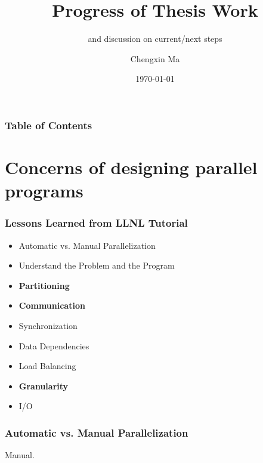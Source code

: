 \documentclass{beamer}
\title[Progress of Thesis Work] %
{Progress of Thesis Work}
\subtitle {and discussion on current/next steps}
\author[C Ma] %
{Chengxin Ma}
\institute[TU Delft] %
{
  \inst{}
  Faculty of Electrical Engineering, Mathematics and Computer Science \\
  Delft University of Technology
}
\date{\today}
\begin{document}
\frame{\titlepage}

\begin{frame}
\frametitle{Table of Contents}
\tableofcontents
\end{frame}

\section{Concerns of designing parallel programs}

\begin{frame}
\frametitle{Lessons Learned from LLNL Tutorial}

\begin{itemize}
  \item Automatic vs. Manual Parallelization
  \item Understand the Problem and the Program
  \item \textbf{Partitioning}
  \item \textbf{Communication}
  \item Synchronization
  \item Data Dependencies
  \item Load Balancing
  \item \textbf{Granularity}
  \item I/O
\end{itemize}

\end{frame}

\begin{frame}
\frametitle{Automatic vs. Manual Parallelization}

Manual.
  
\end{frame}
\end{document}
